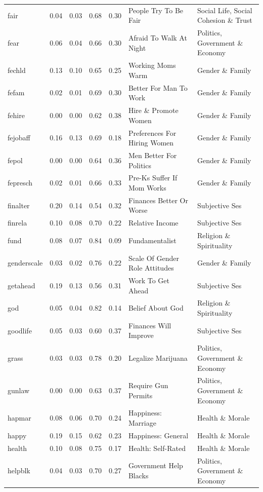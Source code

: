 \documentclass[
  12pt,
]{article}
\begin{document}
\begin{landscape}
\begin{scriptsize}
\begin{longtable}{|p{1.75in}|p{0.3in}|p{0.3in}|p{0.3in}|p{0.3in}|p{2.5in}|p{2.5in}}
fair & 0.04 & 0.03 & 0.68 & 0.30 & People Try To Be Fair & Social Life, Social Cohesion \& Trust \\ 
fear & 0.06 & 0.04 & 0.66 & 0.30 & Afraid To Walk At Night & Politics, Government \& Economy \\ 
fechld & 0.13 & 0.10 & 0.65 & 0.25 & Working Moms Warm & Gender \& Family \\ 
fefam & 0.02 & 0.01 & 0.69 & 0.30 & Better For Man To Work & Gender \& Family \\ 
fehire & 0.00 & 0.00 & 0.62 & 0.38 & Hire \& Promote Women & Gender \& Family \\ 
fejobaff & 0.16 & 0.13 & 0.69 & 0.18 & Preferences For Hiring Women & Gender \& Family \\ 
fepol & 0.00 & 0.00 & 0.64 & 0.36 & Men Better For Politics & Gender \& Family \\ 
fepresch & 0.02 & 0.01 & 0.66 & 0.33 & Pre-Ks Suffer If Mom Works & Gender \& Family \\ 
finalter & 0.20 & 0.14 & 0.54 & 0.32 & Finances Better Or Worse & Subjective Ses \\ 
finrela & 0.10 & 0.08 & 0.70 & 0.22 & Relative Income & Subjective Ses \\ 
fund & 0.08 & 0.07 & 0.84 & 0.09 & Fundamentalist & Religion \& Spirituality \\ 
genderscale & 0.03 & 0.02 & 0.76 & 0.22 & Scale Of Gender Role Attitudes & Gender \& Family \\ 
getahead & 0.19 & 0.13 & 0.56 & 0.31 & Work To Get Ahead & Subjective Ses \\ 
god & 0.05 & 0.04 & 0.82 & 0.14 & Belief About God & Religion \& Spirituality \\ 
goodlife & 0.05 & 0.03 & 0.60 & 0.37 & Finances Will Improve & Subjective Ses \\ 
grass & 0.03 & 0.03 & 0.78 & 0.20 & Legalize Marijuana & Politics, Government \& Economy \\ 
gunlaw & 0.00 & 0.00 & 0.63 & 0.37 & Require Gun Permits & Politics, Government \& Economy \\ 
hapmar & 0.08 & 0.06 & 0.70 & 0.24 & Happiness: Marriage & Health \& Morale \\ 
happy & 0.19 & 0.15 & 0.62 & 0.23 & Happiness: General & Health \& Morale \\ 
health & 0.10 & 0.08 & 0.75 & 0.17 & Health: Self-Rated & Health \& Morale \\ 
helpblk & 0.04 & 0.03 & 0.70 & 0.27 & Government Help Blacks & Politics, Government \& Economy \\ 

\end{longtable}
\end{scriptsize}
\end{landscape}
\end{document}
